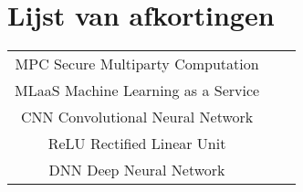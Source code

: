 \chapter*{Lijst van afkortingen}
\begin{table}[!h]
	\begin{tabular}{cll}
		MPC				Secure Multiparty Computation\\
		MLaaS			Machine Learning as a Service\\
		CNN				Convolutional Neural Network\\
		ReLU			Rectified Linear Unit\\
		DNN 			Deep Neural Network\\
	\end{tabular}
\end{table}
